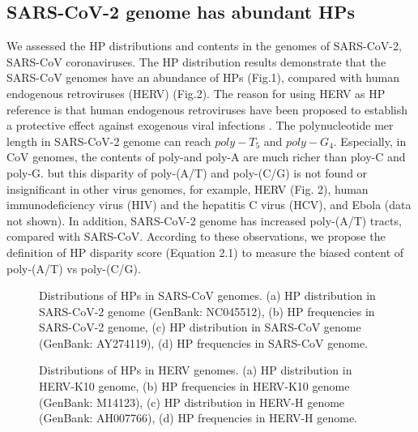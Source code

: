 \documentclass{article}
\numberwithin{equation}{section}
\begin{document}
\subsection{SARS-CoV-2 genome has abundant HPs}
We assessed the HP distributions and contents in the genomes of SARS-CoV-2, SARS-CoV coronaviruses. The HP distribution results demonstrate that the SARS-CoV genomes have an abundance of HPs (Fig.1), compared with human endogenous retroviruses (HERV) \citep{nelson2003demystified} (Fig.2). The reason for using HERV as HP reference is that human endogenous retroviruses have been proposed to establish a protective effect against exogenous viral infections \citep{nelson2003demystified}. The polynucleotide mer length in SARS-CoV-2 genome can reach $poly-{T_5}$ and $poly-{G_4}$. Especially, in CoV genomes, the contents of poly-and poly-A are much richer than ploy-C and poly-G. but this disparity of poly-(A/T) and poly-(C/G) is not found or insignificant in other virus genomes, for example, HERV (Fig. 2), human immunodeficiency virus (HIV) and the hepatitis C virus (HCV), and Ebola (data not shown). In addition, SARS-CoV-2 genome has increased poly-(A/T) tracts, compared with SARS-CoV. According to these observations, we propose the definition of HP disparity score (Equation 2.1) to measure the biased content of poly-(A/T) vs poly-(C/G).

\begin{figure}[tbp]
	\centering
	\quad
    \quad
	\caption{Distributions of HPs in SARS-CoV genomes. (a) HP distribution in SARS-CoV-2 genome (GenBank: NC045512), (b) HP frequencies in SARS-CoV-2 genome,  (c) HP distribution in SARS-CoV genome (GenBank: AY274119), (d) HP frequencies in SARS-CoV genome.}
	\label{fig:sub1}
\end{figure}
\begin{figure}[tbp]
	\centering
	\quad
	\quad
	\caption{Distributions of HPs in HERV genomes. (a) HP distribution in HERV-K10 genome, (b) HP frequencies in HERV-K10 genome (GenBank: M14123),  (c) HP distribution in HERV-H genome (GenBank: AH007766), (d) HP frequencies in HERV-H genome.}
	\label{fig:sub1}
\end{figure}
\end{document}
